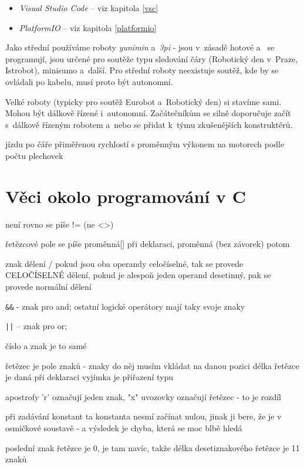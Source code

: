\begin{itemize} 
	\item  {\it Visual Studio Code} -- viz kapitola \ref{vsc}
	\item  {\it PlatformIO }-- viz kapitola \ref{platformio}
\end{itemize}


Jako střední používáme roboty {\it yunimin} a~{\it 3pi} - jsou v~zásadě hotové
a~ se programují, jsou určené pro soutěže typu sledování čáry (Robotický den v~Praze, Istrobot), minisumo a~další. 
Pro střední roboty neexistuje soutěž, kde by se ovládali po kabelu, musí proto být autonomní.    

Velké roboty (typicky pro soutěž Eurobot a~Robotický den) si stavíme sami. 
Mohou být dálkově řízené i~autonomní. 
Začátečníkům se silně doporučuje začít s~dálkově řízeným robotem a~nebo se přidat k~týmu zkušenějších konstruktérů.   


jízdu po čáře přiměřenou rychlostí
s proměnným výkonem na motorech podle počtu plechovek 


 \section{Věci okolo programování v C}
  
  není rovno se píše != (ne <>)
  
  řetězcové pole se píše proměnná[] při deklaraci, proměnná (bez závorek) potom 
  
 znak dělení /   pokud jsou oba operandy celočíselné, tak se provede CELOČÍSELNÉ dělení, pokud je alespoň jeden operand desetinný, pak se provede normální dělení
 
 \verb#&&# - znak pro and; ostatní logické operátory  mají taky svoje znaky 
 
 \verb#||# -- znak pro or;
 
 číslo a znak je to samé 
 
 řetězec je pole znaků - znaky do něj musím vkládat na danou pozici 
 délka řetězce je daná při deklaraci vyjímka je přiřazení typu   
 
 apostrofy 'r' označují jeden znak, "x" uvozovky označují řetězec - to je rozdíl 
 
 při zadávání konstant ta konstanta nesmí začínat nulou, jinak ji bere, že je v osmičkové soustavě - a výsledek je chyba, která se moc blbě hledá
 
poslední znak řetězce je 0, je tam navíc, takže délka desetiznakového řetězce je 11 znaků 

